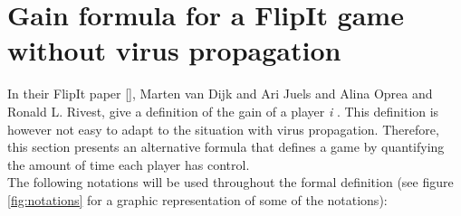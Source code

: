 \section{Gain formula for a FlipIt game without virus propagation}
\label{ch:8:GainFlip}
In their FlipIt paper [], Marten van Dijk and Ari Juels and Alina Oprea and Ronald L. Rivest, give a definition of the gain of a player \textit{i} . This definition is however not easy to adapt to the situation with virus propagation. Therefore, this section presents an alternative formula that defines a game by quantifying the amount of time each player has control. \\


The following notations will be used throughout the formal definition (see figure \ref{fig:notations} for a graphic representation of some of the notations):

